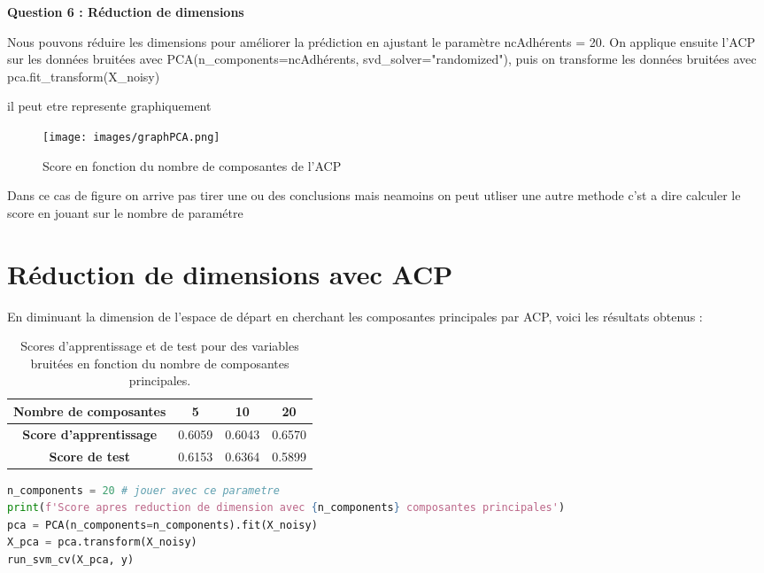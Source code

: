 \documentclass[10pt,a4paper]{article}
\begin{document}
\newpage\textbf{Question 6 : Réduction de dimensions}


Nous pouvons réduire les dimensions pour améliorer la prédiction en ajustant le paramètre ncAdhérents = 20. On applique ensuite l'ACP sur les données bruitées avec PCA(n_components=ncAdhérents, svd_solver="randomized"), puis on transforme les données bruitées avec pca.fit_transform(X_noisy)

il peut etre represente graphiquement 





\begin{figure}[H]
    \centering
    \texttt{[image: images/graphPCA.png]}
    \caption{Score en fonction du nombre de composantes de l'ACP}
    \label{fig:q6}
\end{figure}

Dans ce cas de figure on arrive pas tirer une ou des conclusions mais neamoins on peut utliser une autre methode c'st a dire calculer le score en jouant sur le nombre de paramétre 


\section*{Réduction de dimensions avec ACP}

En diminuant la dimension de l'espace de départ en cherchant les composantes principales par ACP, voici les résultats obtenus :

\begin{table}[h!]
    \centering
    \begin{tabular}{|c|c|c|c|}
        \hline
        \textbf{Nombre de composantes} & 5 & 10 & 20 \\
        \hline
        \textbf{Score d'apprentissage} & 0.6059 & 0.6043& 0.6570 \\
        \hline
        \textbf{Score de test} & 0.6153 & 0.6364& 0.5899 \\
        \hline
    \end{tabular}
    \caption{Scores d'apprentissage et de test pour des variables bruitées en fonction du nombre de composantes principales.}
\end{table}


\begin{lstlisting}[language=Python, caption=Réduction de dimensions avec ACP]
n_components = 20 # jouer avec ce parametre
print(f'Score apres reduction de dimension avec {n_components} composantes principales')
pca = PCA(n_components=n_components).fit(X_noisy)
X_pca = pca.transform(X_noisy)
run_svm_cv(X_pca, y)
\end{lstlisting}
\end{document}
